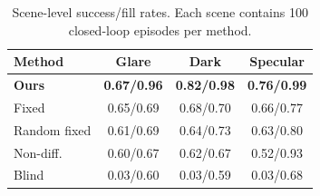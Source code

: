 \begin{table}[t]
\centering
\small
\begin{tabular}{lccc}
\toprule
Method & Glare & Dark & Specular \\
\midrule
\textbf{Ours} & \textbf{0.67/0.96} & \textbf{0.82/0.98} & \textbf{0.76/0.99} \\
Fixed & 0.65/0.69 & 0.68/0.70 & 0.66/0.77 \\
Random fixed & 0.61/0.69 & 0.64/0.73 & 0.63/0.80 \\
Non-diff. & 0.60/0.67 & 0.62/0.67 & 0.52/0.93 \\
Blind & 0.03/0.60 & 0.03/0.59 & 0.03/0.68 \\
\bottomrule
\end{tabular}
\caption{Scene-level success/fill rates. Each scene contains 100 closed-loop episodes per method.}
\label{tab:journal_scene_breakdown}
\end{table}

